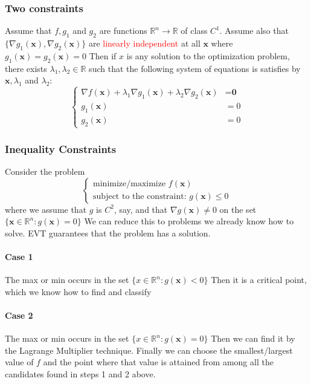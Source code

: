 \documentclass[11pt]{article}
\newcommand{\tb}[1]{\textbf{#1}}
\newcommand{\real}[0]{\mathbb{R}}
\begin{document}
\subsubsection{Two constraints}
Assume that $f, g_1$ and $g_2$ are functions $\real^n \rightarrow \real$ of class $C^1$. Assume also that $\{ \nabla g_1(\tb{x}), \nabla g_2(\tb{x})\}$ are \textcolor{red}{linearly independent} at all $\tb{x}$ where $g_1(\tb{x}) = g_2(\tb{x}) = 0$ \newline
Then if $x$ is any solution to the optimization problem, there exists $\lambda_1, \lambda_2 \in \real$ such that the following system of equations is satisfies by $\tb{x}, \lambda_1$ and $\lambda_2$:
\begin{equation*}
\begin{cases}
  \nabla f(\tb{x}) + \lambda_1 \nabla g_1(\tb{x}) + \lambda_2 \nabla g_2(\tb{x}) &= \tb{0} \\
  g_1(\tb{x}) &= 0\\
  g_2(\tb{x}) &= 0
\end{cases}
\end{equation*}
\subsubsection{Inequality Constraints}
Consider the problem
\begin{equation*}
    \begin{cases}
        \mbox{minimize/maximize } f(\tb{x})\\
        \mbox{subject to the constraint: } g(\tb{x}) \leq 0
    \end{cases}
\end{equation*}
where we assume that $g$ is $C^2$, say, and that $\nabla g(\tb{x}) \neq 0$ on the set $\{\tb{x}\in \real^n: g(\tb{x}) = 0\}$ \newline
We can reduce this to problems we already know how to solve. EVT guarantees that the problem has a solution.
\paragraph{Case 1} The max or min occurs in the set $\{x\in \real^n: g(\tb{x}) < 0\}$ \newline
Then it is a critical point, which we know how to find and classify
\paragraph{Case 2} The max or min occurs in the set $\{x\in \real^n: g(\tb{x}) = 0\}$ \newline
Then we can find it by the Lagrange Multiplier technique. \newline
Finally we can choose the smallest/largest value of $f$ and the point where that value is attained from among all the candidates found in steps 1 and 2 above.
\end{document}
